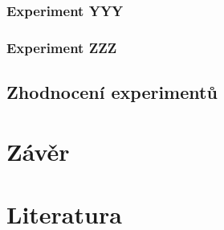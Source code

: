 \documentclass[a4paper,11pt]{article}
\begin{document}
\subsubsection{Experiment YYY}
\subsubsection{Experiment ZZZ}
\subsection{Zhodnocení experimentů}

\section{Závěr}


\section{Literatura}


{}

\end{document}
